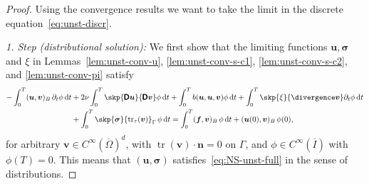 \documentclass[reqno,a4paper]{amsart}
\def\tens#1{\pmb{\mathsf{#1}}}
\def\vec#1{\boldsymbol{#1}}
\def\tr{\mathop{\mathrm{tr}}\nolimits}
\def\d{{\rm d}}
\def\dt{\,\d t}
\def\bf{\vec{f}}
\def\bn{\vec{n}}
\def\bu{\vec{u}}
\def\bv{\vec{v}}
\def\bsigma{\vec{\sigma}}
\def\BD{\tens{D}}
\begin{document}
	\begin{proof}
		Using the convergence results we want to take the limit in the discrete equation~\eqref{eq:unst-discr}.  
		
		\textit{1. Step (distributional solution):}
		We first show that the limiting  functions $\bu, \bsigma$  and $\xi$  in Lemmas~\ref{lem:unst-conv-u}, \ref{lem:unst-conv-s-c1}, \ref{lem:unst-conv-s-c2}, and \ref{lem:unst-conv-pi} satisfy
		\begin{equation}\label{eq:unst-lim-eq-1a}
			\begin{aligned}
				- \int_0^T ( \bu, \bv)_{B}\, \partial_t \phi \dt  
				&+ 2 \nu \int_{0}^T \skp{\BD \bu}{ \BD \bv} \phi \dt 
				+ \int_0^T b(\bu,\bu,\bv) \phi \dt 
				+ \int_0^T \skp{\xi}{\divergence \bv} \partial_t \phi \dt 
				\\
				& + \int_{0}^T \skp{\bsigma}{\tr_\tau(\bv)}_{\Gamma} \, \phi \dt  
				=
				\int_{0}^T ( \bf, {\bv})_B \,\phi  \dt
				+ (\bu(0),  \bv)_B \, \phi(0),
			\end{aligned}
		\end{equation}
		for arbitrary $\bv \in C^{\infty}(\overline \Omega)^d$, with $\tr(\bv) \cdot \bn  = 0$ on $\Gamma$, and $\phi \in C^{\infty}(\overline I)$ with $\phi(T) = 0$. 
		This means that $(\bu,\bsigma)$ satisfies~\eqref{eq:NS-unst-full} in the sense of distributions. 
	

\end{proof}
\end{document}
